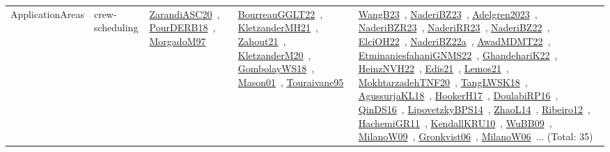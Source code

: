 {\begin{longtable}{lp{3cm}>{\raggedright\arraybackslash}p{6cm}>{\raggedright\arraybackslash}p{6cm}>{\raggedright\arraybackslash}p{8cm}}
\index{crew-scheduling}\index{ApplicationAreas!crew-scheduling}ApplicationAreas & crew-scheduling & \href{../works/ZarandiASC20.pdf}{ZarandiASC20}~\cite{ZarandiASC20}, \href{../works/PourDERB18.pdf}{PourDERB18}~\cite{PourDERB18}, \href{../works/MorgadoM97.pdf}{MorgadoM97}~\cite{MorgadoM97} & \href{../works/BourreauGGLT22.pdf}{BourreauGGLT22}~\cite{BourreauGGLT22}, \href{../works/KletzanderMH21.pdf}{KletzanderMH21}~\cite{KletzanderMH21}, \href{../works/Zahout21.pdf}{Zahout21}~\cite{Zahout21}, \href{../works/KletzanderM20.pdf}{KletzanderM20}~\cite{KletzanderM20}, \href{../works/GombolayWS18.pdf}{GombolayWS18}~\cite{GombolayWS18}, \href{../works/Mason01.pdf}{Mason01}~\cite{Mason01}, \href{../works/Touraivane95.pdf}{Touraivane95}~\cite{Touraivane95} & \href{../works/WangB23.pdf}{WangB23}~\cite{WangB23}, \href{../works/NaderiBZ23.pdf}{NaderiBZ23}~\cite{NaderiBZ23}, \href{../works/Adelgren2023.pdf}{Adelgren2023}~\cite{Adelgren2023}, \href{../works/NaderiBZR23.pdf}{NaderiBZR23}~\cite{NaderiBZR23}, \href{../works/NaderiRR23.pdf}{NaderiRR23}~\cite{NaderiRR23}, \href{../works/NaderiBZ22.pdf}{NaderiBZ22}~\cite{NaderiBZ22}, \href{../works/ElciOH22.pdf}{ElciOH22}~\cite{ElciOH22}, \href{../works/NaderiBZ22a.pdf}{NaderiBZ22a}~\cite{NaderiBZ22a}, \href{../works/AwadMDMT22.pdf}{AwadMDMT22}~\cite{AwadMDMT22}, \href{../works/EtminaniesfahaniGNMS22.pdf}{EtminaniesfahaniGNMS22}~\cite{EtminaniesfahaniGNMS22}, \href{../works/GhandehariK22.pdf}{GhandehariK22}~\cite{GhandehariK22}, \href{../works/HeinzNVH22.pdf}{HeinzNVH22}~\cite{HeinzNVH22}, \href{../works/Edis21.pdf}{Edis21}~\cite{Edis21}, \href{../works/Lemos21.pdf}{Lemos21}~\cite{Lemos21}, \href{../works/MokhtarzadehTNF20.pdf}{MokhtarzadehTNF20}~\cite{MokhtarzadehTNF20}, \href{../works/TangLWSK18.pdf}{TangLWSK18}~\cite{TangLWSK18}, \href{../works/AgussurjaKL18.pdf}{AgussurjaKL18}~\cite{AgussurjaKL18}, \href{../works/HookerH17.pdf}{HookerH17}~\cite{HookerH17}, \href{../works/DoulabiRP16.pdf}{DoulabiRP16}~\cite{DoulabiRP16}, \href{../works/QinDS16.pdf}{QinDS16}~\cite{QinDS16}, \href{../works/LipovetzkyBPS14.pdf}{LipovetzkyBPS14}~\cite{LipovetzkyBPS14}, \href{../works/ZhaoL14.pdf}{ZhaoL14}~\cite{ZhaoL14}, \href{../works/Ribeiro12.pdf}{Ribeiro12}~\cite{Ribeiro12}, \href{../works/HachemiGR11.pdf}{HachemiGR11}~\cite{HachemiGR11}, \href{../works/KendallKRU10.pdf}{KendallKRU10}~\cite{KendallKRU10}, \href{../works/WuBB09.pdf}{WuBB09}~\cite{WuBB09}, \href{../works/MilanoW09.pdf}{MilanoW09}~\cite{MilanoW09}, \href{../works/Gronkvist06.pdf}{Gronkvist06}~\cite{Gronkvist06}, \href{../works/MilanoW06.pdf}{MilanoW06}~\cite{MilanoW06}... (Total: 35)\\

\end{longtable}}
